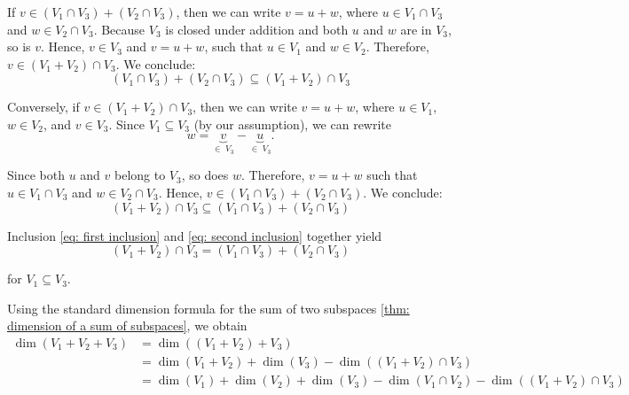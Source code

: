 \begin{xrcs}
  \begin{xprf}
    If $v \in (V_1 \cap V_3) + (V_2 \cap V_3)$, then we can write $v = u + w$, where $u \in V_1\cap V_3$ and  $w \in V_2 \cap V_3$.
    Because $V_3$ is closed under addition and both $u$ and $w$ are in $V_3$, so is $v$. Hence, $v \in V_3$ and $v=u+w$, such that $u \in V_1$ and $w \in V_2$. Therefore, $v \in (V_1 + V_2) \cap V_3$. We conclude:
    \begin{equation}
      \label{eq: first inclusion}
      (V_1 \cap V_3) + (V_2 \cap V_3) \subseteq (V_1 + V_2) \cap V_3
    \end{equation}

    Conversely, if $v \in (V_1 + V_2) \cap V_3$, then we can write $v = u + w$, where $u \in V_1$, $w \in V_2$, and $v \in V_3$. Since $V_1 \subseteq V_3$ (by our assumption), we can rewrite
    \begin{equation}
      w = \underbrace{v}_{\in \; V_3}-\underbrace{u}_{\in \; V_3}.
    \end{equation}

    Since both $u$ and $v$ belong to $V_3$, so does $w$. Therefore, $v=u+w$ such that $u \in V_1 \cap V_3$ and $w \in V_2 \cap V_3$. Hence, $v \in (V_1 \cap V_3) + (V_2 \cap V_3)$. We conclude:
    \begin{equation}
      \label{eq: second inclusion}
      (V_1 + V_2) \cap V_3 \subseteq (V_1 \cap V_3) + (V_2 \cap V_3)
    \end{equation}

    Inclusion \eqref{eq: first inclusion} and \eqref{eq: second inclusion} together yield
    \begin{equation}
      (V_1 + V_2) \cap V_3 = (V_1 \cap V_3) + (V_2 \cap V_3)
    \end{equation}

    for $V_1 \subseteq V_3$.
  \end{xprf}


  Using the standard dimension formula  for the sum of two subspaces \eqref{thm: dimension of a sum of subspaces}, we obtain
  \begin{equation}
    \label{eq: first forumla}
    \begin{aligned}
      \dim (V_1 + V_2 + V_3) &= \dim ((V_1+V_2) + V_3) \\
        &= \dim (V_1 + V_2) + \dim (V_3) - \dim((V_1 +V_2) \cap V_3) \\
        &= \dim (V_1) + \dim (V_2) + \dim (V_3) - \dim (V_1 \cap V_2) - \dim ((V_1 + V_2) \cap V_3)
    \end{aligned}
  \end{equation}


\end{xrcs}
